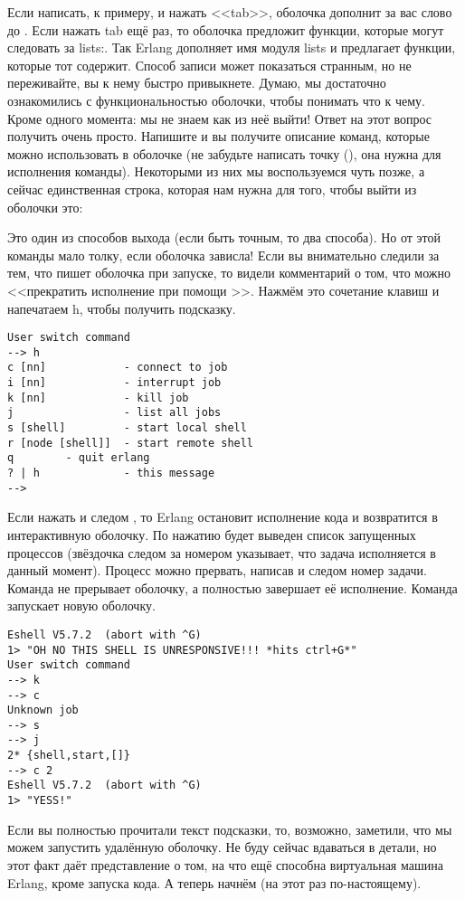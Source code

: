 Если написать, к примеру,  и нажать <<tab>>, оболочка дополнит за вас слово до .
Если нажать tab ещё раз, то оболочка предложит функции, которые могут следовать за lists:.
Так Erlang дополняет имя модуля lists и предлагает функции, которые тот содержит.
Способ записи может показаться странным, но не переживайте, вы к нему быстро привыкнете.
Думаю, мы достаточно ознакомились с функциональностью оболочки, чтобы понимать что к чему.
Кроме одного момента: мы не знаем как из неё выйти!
Ответ на этот вопрос получить очень просто.
Напишите  и вы получите описание команд, которые можно использовать в оболочке (не забудьте написать точку (), она нужна для исполнения команды).
Некоторыми из них мы воспользуемся чуть позже, а сейчас единственная строка, которая нам нужна для того, чтобы выйти из оболочки это:\\ 

Это один из способов выхода (если быть точным, то два способа).
Но от этой команды мало толку, если оболочка зависла!
Если вы внимательно следили за тем, что пишет оболочка при запуске, то видели комментарий о том, что можно <<прекратить исполнение при помощи >>.
Нажмём это сочетание клавиш и напечатаем h, чтобы получить подсказку.
\begin{lstlisting}[style=repl]
User switch command
--> h
c [nn]            - connect to job
i [nn]            - interrupt job
k [nn]            - kill job
j                 - list all jobs
s [shell]         - start local shell
r [node [shell]]  - start remote shell
q        - quit erlang
? | h             - this message
-->
\end{lstlisting}

Если нажать  и следом , то Erlang остановит исполнение кода и возвратится в интерактивную оболочку.
По нажатию  будет выведен список запущенных процессов (звёздочка следом за номером указывает, что задача исполняется в данный момент).
Процесс можно прервать, написав  и следом номер задачи.
Команда  не прерывает оболочку, а полностью завершает её исполнение.
Команда  запускает новую оболочку.
\begin{lstlisting}[style=repl]
Eshell V5.7.2  (abort with ^G)
1> "OH NO THIS SHELL IS UNRESPONSIVE!!! *hits ctrl+G*"
User switch command
--> k
--> c
Unknown job
--> s
--> j
2* {shell,start,[]}
--> c 2
Eshell V5.7.2  (abort with ^G)
1> "YESS!"
\end{lstlisting}

Если вы полностью прочитали текст подсказки, то, возможно, заметили, что мы можем запустить удалённую оболочку.
Не буду сейчас вдаваться в детали, но этот факт даёт представление о том, на что ещё способна виртуальная машина Erlang, кроме запуска кода.
А теперь начнём (на этот раз по\--настоящему).
